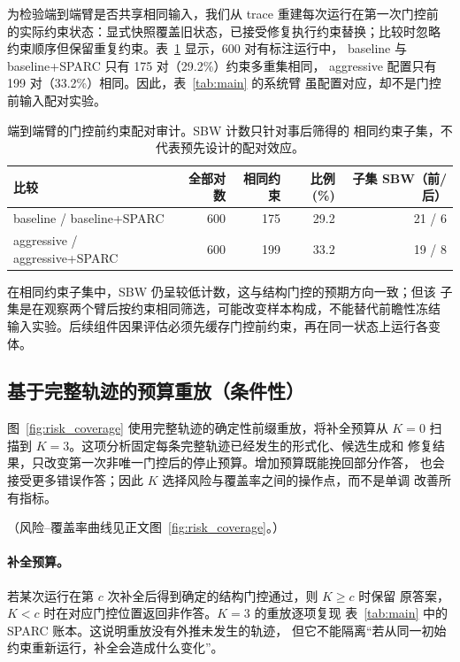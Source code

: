 \documentclass[letterpaper]{article}
\newcommand{\method}{SPARC}
\newcommand{\sbw}{SBW}
\begin{document}
为检验端到端臂是否共享相同输入，我们从 trace 重建每次运行在第一次门控前
的实际约束状态：显式快照覆盖旧状态，已接受修复执行约束替换；比较时忽略
约束顺序但保留重复约束。表~\ref{tab:pairing-audit} 显示，600 对有标注运行中，
baseline 与 baseline+\method{} 只有 175 对（29.2\%）约束多重集相同，
aggressive 配置只有 199 对（33.2\%）相同。因此，表~\ref{tab:main} 的系统臂
虽配置对应，却不是门控前输入配对实验。

\begin{table}[ht]
  \centering
  \caption{端到端臂的门控前约束配对审计。\sbw{} 计数只针对事后筛得的
  相同约束子集，不代表预先设计的配对效应。}
  \label{tab:pairing-audit}
  \small
  \begin{tabular}{lrrrr}
    \toprule
    比较 & 全部对数 & 相同约束 & 比例(\%) & 子集 \sbw{}（前/后） \\
    \midrule
    baseline / baseline+\method{}     & 600 & 175 & 29.2 & 21 / 6 \\
    aggressive / aggressive+\method{} & 600 & 199 & 33.2 & 19 / 8 \\
    \bottomrule
  \end{tabular}
\end{table}

在相同约束子集中，\sbw{} 仍呈较低计数，这与结构门控的预期方向一致；但该
子集是在观察两个臂后按约束相同筛选，可能改变样本构成，不能替代前瞻性冻结
输入实验。后续组件因果评估必须先缓存门控前约束，再在同一状态上运行各变体。

\subsection{基于完整轨迹的预算重放（条件性）}

图~\ref{fig:risk_coverage} 使用完整轨迹的确定性前缀重放，将补全预算从
$K=0$ 扫描到 $K=3$。这项分析固定每条完整轨迹已经发生的形式化、候选生成和
修复结果，只改变第一次非唯一门控后的停止预算。增加预算既能挽回部分作答，
也会接受更多错误作答；因此 $K$ 选择风险与覆盖率之间的操作点，而不是单调
改善所有指标。

（风险--覆盖率曲线见正文图~\ref{fig:risk_coverage}。）

\paragraph{补全预算。}
\label{sec:ablation}

若某次运行在第 $c$ 次补全后得到确定的结构门控通过，则 $K\geq c$ 时保留
原答案，$K<c$ 时在对应门控位置返回非作答。$K=3$ 的重放逐项复现
表~\ref{tab:main} 中的 \method{} 账本。这说明重放没有外推未发生的轨迹，
但它不能隔离“若从同一初始约束重新运行，补全会造成什么变化”。
\end{document}
